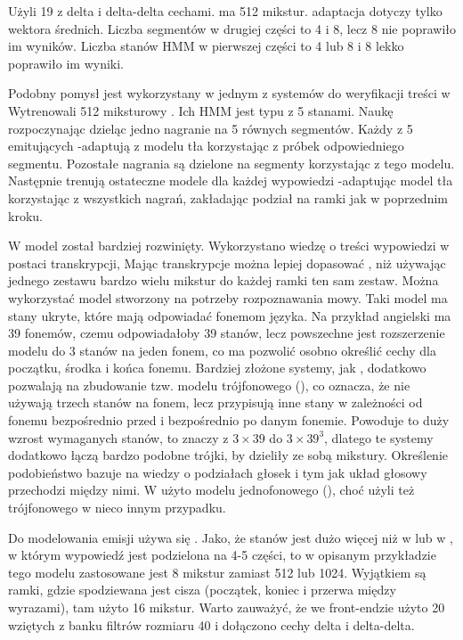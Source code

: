 Użyli 19  z delta i delta-delta cechami.  ma 512 mikstur.  adaptacja
dotyczy tylko wektora średnich. Liczba segmentów w drugiej części to 4 i 8, lecz 8 nie poprawiło im wyników. Liczba
stanów HMM w pierwszej części to 4 lub 8 i 8 lekko poprawiło im wyniki.

Podobny pomysł jest wykorzystany w jednym z systemów do weryfikacji treści w \cite{utteranceVerificationFor}
Wytrenowali 512 miksturowy . Ich HMM jest typu  z 5 stanami.
Naukę rozpoczynając dzieląc jedno nagranie na 5 równych segmentów.
Każdy z 5  emitujących -adaptują z modelu tła korzystając z próbek odpowiedniego segmentu.
Pozostałe nagrania są dzielone na segmenty korzystając z tego modelu. Następnie trenują ostateczne modele dla każdej
wypowiedzi -adaptując model tła korzystając z wszystkich nagrań, zakładając podział na ramki jak
w poprzednim kroku.

W \cite{comparisonOfMultiple}
model  został bardziej rozwinięty. Wykorzystano wiedzę o treści wypowiedzi w postaci transkrypcji,
Mając transkrypcje można lepiej dopasować , niż używając jednego zestawu bardzo wielu mikstur
do każdej ramki ten sam zestaw.
Można wykorzystać model stworzony na potrzeby rozpoznawania mowy.
Taki model ma stany ukryte, które mają odpowiadać fonemom języka. Na przykład angielski ma 39
fonemów, czemu odpowiadałoby 39 stanów, lecz powszechne jest rozszerzenie
modelu do 3 stanów na jeden fonem, co ma pozwolić osobno określić cechy dla początku, środka i końca fonemu.
Bardziej złożone systemy, jak \cite{theHtkBook}
, dodatkowo pozwalają na zbudowanie tzw. modelu trójfonowego (), co oznacza,
że nie używają trzech stanów na fonem, lecz
przypisują inne stany w zależności od fonemu bezpośrednio przed i bezpośrednio po danym fonemie.
Powoduje to duży wzrost wymaganych stanów, to znaczy z $3 \times 39$ do $3 \times 39^3$,
dlatego te systemy dodatkowo łączą bardzo podobne trójki, by dzieliły ze sobą mikstury.
Określenie podobieństwo bazuje na wiedzy o podziałach głosek i tym jak układ głosowy przechodzi między nimi.
W \cite{comparisonOfMultiple}
użyto modelu jednofonowego (), choć użyli też trójfonowego w nieco innym przypadku.

Do modelowania emisji używa się . Jako, że stanów jest dużo więcej niż w 
lub w , w którym wypowiedź jest podzielona na 4-5 części, to
w opisanym przykładzie tego modelu zastosowane jest 8 mikstur zamiast 512 lub 1024. Wyjątkiem są ramki,
gdzie spodziewana jest cisza (początek, koniec i przerwa między wyrazami), tam
użyto 16 mikstur. Warto zauważyć, że we front-endzie użyto 20  wziętych z banku filtrów rozmiaru
40 i dołączono cechy delta i delta-delta.

